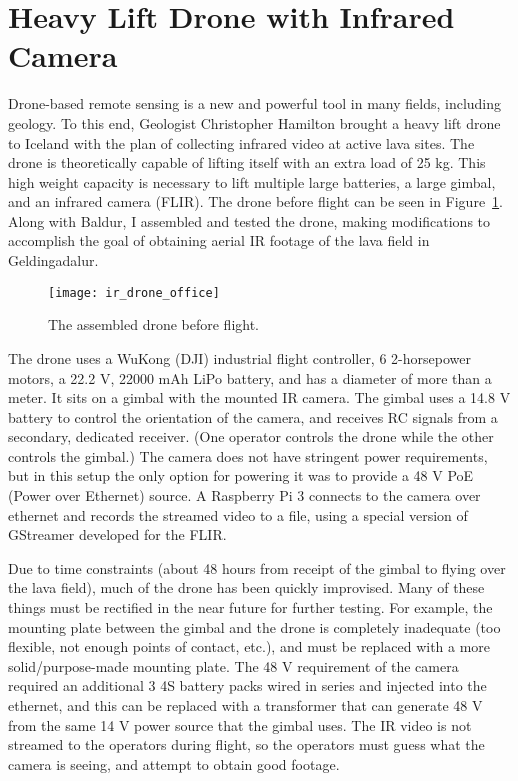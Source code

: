 \section{Heavy Lift Drone with Infrared Camera}
\label{section:ir_drone}

Drone-based remote sensing is a new and powerful tool in many fields, including geology.
To this end, Geologist Christopher Hamilton brought a heavy lift drone to Iceland
with the plan of collecting infrared video at active lava sites.
The drone is theoretically capable of lifting itself with an extra load of 25 kg.
This high weight capacity is necessary to lift multiple large batteries,
a large gimbal,
and an infrared camera (FLIR).
The drone before flight can be seen in Figure~\ref{figure:ir_drone_office}.
Along with Baldur, I assembled and tested the drone, making modifications to accomplish the goal of obtaining
aerial IR footage of the lava field in Geldingadalur.

\begin{figure}
    \centering
    \texttt{[image: ir\_drone\_office]}
    \caption{The assembled drone before flight.}
    \label{figure:ir_drone_office}
\end{figure}

The drone uses a WuKong (DJI) industrial flight controller,
6 2-horsepower motors,
a 22.2 V, 22000 mAh LiPo battery,
and has a diameter of more than a meter.
It sits on a gimbal with the mounted IR camera.
The gimbal uses a 14.8 V battery to control the orientation of the camera,
and receives RC signals from a secondary, dedicated receiver.
(One operator controls the drone while the other controls the gimbal.)
The camera does not have stringent power requirements,
but in this setup the only option for powering it was to provide
a 48 V PoE (Power over Ethernet) source.
A Raspberry Pi 3 connects to the camera over ethernet and records the streamed
video to a file, using a special version of GStreamer developed for the FLIR.

Due to time constraints (about 48 hours from receipt of the gimbal
to flying over the lava field),
much of the drone has been quickly improvised.
Many of these things must be rectified in the near future for further testing.
For example, the mounting plate between the gimbal and the drone
is completely inadequate (too flexible, not enough points of contact, etc.),
and must be replaced with a more solid/purpose-made mounting plate.
The 48 V requirement of the camera required an additional 3 4S battery packs
wired in series and injected into the ethernet,
and this can be replaced with a transformer that can generate 48 V
from the same 14 V power source that the gimbal uses.
The IR video is not streamed to the operators during flight,
so the operators must guess what the camera is seeing, and attempt to obtain good footage.

